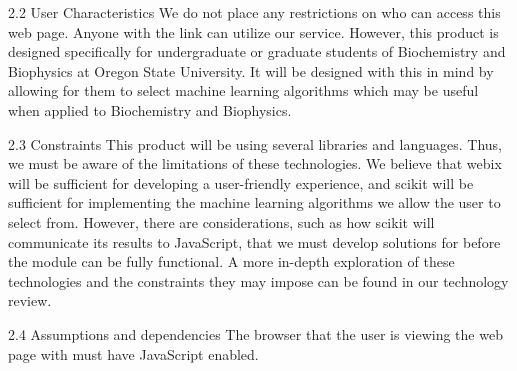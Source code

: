 \documentclass[letterpaper, 10pt,titlepage]{article}
\begin{document}
\begin{section}{2.2 User Characteristics}
We do not place any restrictions on who can access this web page. Anyone with the link can utilize our service. However, this product is designed specifically for undergraduate or graduate students of Biochemistry and Biophysics at Oregon State University. It will be designed with this in mind by allowing for them to select machine learning algorithms which may be useful when applied to Biochemistry and Biophysics. 
\end{section}

\begin{section}{2.3 Constraints}
This product will be using several libraries and languages. Thus, we must be aware of the limitations of these technologies. We believe that webix will be sufficient for developing a user-friendly experience, and scikit will be sufficient for implementing the machine learning algorithms we allow the user to select from. However, there are considerations, such as how scikit will communicate its results to JavaScript, that we must develop solutions for before the module can be fully functional. A more in-depth exploration of these technologies and the constraints they may impose can be found in our technology review. 
\end{section}

\begin{section}{2.4 Assumptions and dependencies}
The browser that the user is viewing the web page with must have JavaScript enabled.
\end{section}
\end{document}
